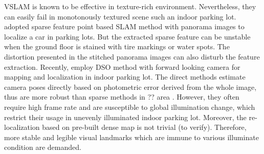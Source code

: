 \documentclass[journal]{IEEEtran}
\begin{document}
%

VSLAM is known to be effective in texture-rich environment\citep{ORB}.
Nevertheless, they can easily fail in monotonously textured scene such an indoor parking lot.
\citet{VW paking} adopted sparse feature point based SLAM method with panorama images to localize a car in parking lots.
But the extracted sparse feature can be unstable when the ground floor is stained with tire markings or water spots.
The distortion presented in the stitched panorama images can also disturb the feature extraction.
Recently, \citet{Horizon DSO} employ DSO method with forward looking camera for mapping and localization in indoor parking lot.
The direct methods estimate camera poses directly based on photometric error derived from the whole image, thus are more robust than sparse methods in ?? area \citep{}.
However, they often require high frame rate and are susceptible to global illumination change, which restrict their usage in unevenly illuminated indoor parking lot\citep{}. 
Moreover, the re-localization based on pre-built dense map is not trivial (to verify).
Therefore, more stable and legible visual landmarks which are immune to various illuminate condition are demanded.

%

	
\end{document}
